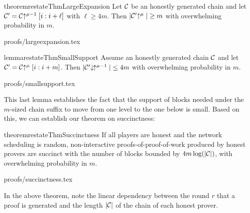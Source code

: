 \begin{restatable}{theorem}{restateThmLargeExpansion}
    \label{thm.large-expansion}
    Let $\mathcal{C}$ be an honestly generated chain and let
    $\mathcal{C}' = \mathcal{C}\negthickspace\uparrow^{\mu - 1}[i:i + \ell]$ with $\ell \geq 4m$.
    Then $|\mathcal{C}'\negthickspace\uparrow^\mu| \geq m$
    with overwhelming probability in $m$.
\end{restatable}
\ifonecolumn
{proofs/largeexpansion.tex}
\fi

\begin{restatable}{lemma}{restateThmSmallSupport}
    \label{lem.small-support}
    Assume an honestly generated chain $\mathcal{C}$ and let $\mathcal{C}' =
    \mathcal{C}\negthickspace\uparrow^\mu[i:i + m]$. Then $|\mathcal{C}'\negthickspace\downarrow\,\negthickspace\uparrow^{\mu - 1}|
    \leq 4m$ with overwhelming probability in $m$.
\end{restatable}
\ifonecolumn
{proofs/smallsupport.tex}
\fi

This last lemma establishes the fact that the support of blocks needed under
the $m$-sized chain suffix to move from one level to the one below is small.
Based on this, we can establish our theorem on succinctness:

\begin{restatable}{theorem}{restateThmSuccinctness}
    \label{thm.succinctness}
    If all players are honest and the network scheduling is random,
    non-interactive proofs-of-proof-of-work produced by honest provers are
    succinct with the number of blocks bounded by $4m \log(|\mathcal{C}|)$, with
    overwhelming probability in $m$.
\end{restatable}
\ifonecolumn
{proofs/succinctness.tex}
\fi

In the above theorem, note the linear dependency between the round $r$ that a
proof is generated and the length $|\mathcal{C}|$ of the chain of each honest prover.
